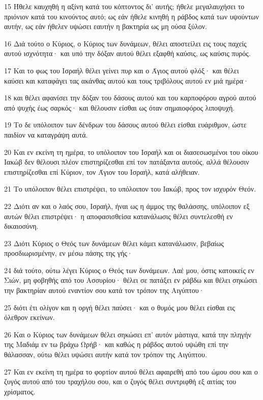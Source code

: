 \par 15 Ήθελε καυχηθή η αξίνη κατά του κόπτοντος δι' αυτής; ήθελε μεγαλαυχήσει το πριόνιον κατά του κινούντος αυτό; ως εάν ήθελε κινηθή η ράβδος κατά των υψούντων αυτήν, ως εάν ήθελεν υψώσει εαυτήν η βακτηρία ως μη ούσα ξύλον.
\par 16 Διά τούτο ο Κύριος, ο Κύριος των δυνάμεων, θέλει αποστείλει εις τους παχείς αυτού ισχνότητα· και υπό την δόξαν αυτού θέλει εξαφθή καύσις, ως καύσις πυρός.
\par 17 Και το φως του Ισραήλ θέλει γείνει πυρ και ο Άγιος αυτού φλόξ· και θέλει καύσει και καταφάγει τας ακάνθας αυτού και τους τριβόλους αυτού εν μιά ημέρα·
\par 18 και θέλει αφανίσει την δόξαν του δάσους αυτού και του καρποφόρου αγρού αυτού από ψυχής έως σαρκός· και θέλουσιν είσθαι ως όταν σημαιοφόρος λιποψυχή.
\par 19 Το δε υπόλοιπον των δένδρων του δάσους αυτού θέλει είσθαι ευάριθμον, ώστε παιδίον να καταγράψη αυτά.
\par 20 Και εν εκείνη τη ημέρα, το υπόλοιπον του Ισραήλ και οι διασεσωσμένοι του οίκου Ιακώβ δεν θέλουσι πλέον επιστηρίζεσθαι επί τον πατάξαντα αυτούς, αλλά θέλουσιν επιστηρίζεσθαι επί Κύριον, τον Άγιον του Ισραήλ, κατά αλήθειαν.
\par 21 Το υπόλοιπον θέλει επιστρέψει, το υπόλοιπον του Ιακώβ, προς τον ισχυρόν Θεόν.
\par 22 Διότι αν και ο λαός σου, Ισραήλ, ήναι ως η άμμος της θαλάσσης, υπόλοιπον εξ αυτών θέλει επιστρέψει· η αποφασισθείσα κατανάλωσις θέλει συντελεσθή εν δικαιοσύνη.
\par 23 Διότι Κύριος ο Θεός των δυνάμεων θέλει κάμει κατανάλωσιν, βεβαίως προσδιωρισμένην, εν μέσω πάσης της γής·
\par 24 διά τούτο, ούτω λέγει Κύριος ο Θεός των δυνάμεων. Λαέ μου, όστις κατοικείς εν Σιών, μη φοβηθής από του Ασσυρίου· θέλει σε πατάξει εν ράβδω και θέλει σηκώσει την βακτηρίαν αυτού εναντίον σου κατά τον τρόπον της Αιγύπτου·
\par 25 διότι έτι ολίγον και η οργή θέλει παύσει· και ο θυμός μου θέλει είσθαι εις όλεθρον εκείνων.
\par 26 Και ο Κύριος των δυνάμεων θέλει σηκώσει επ' αυτόν μάστιγα, κατά την πληγήν της Μαδιάμ εν τω βράχω Ωρήβ· και καθώς η ράβδος αυτού υψώθη επί την θάλασσαν, ούτω θέλει υψώσει αυτήν κατά τον τρόπον της Αιγύπτου.
\par 27 Και εν εκείνη τη ημέρα το φορτίον αυτού θέλει αφαιρεθή από του ώμου σου και ο ζυγός αυτού από του τραχήλου σου, και ο ζυγός θέλει συντριφθή εξ αιτίας του χρίσματος.

